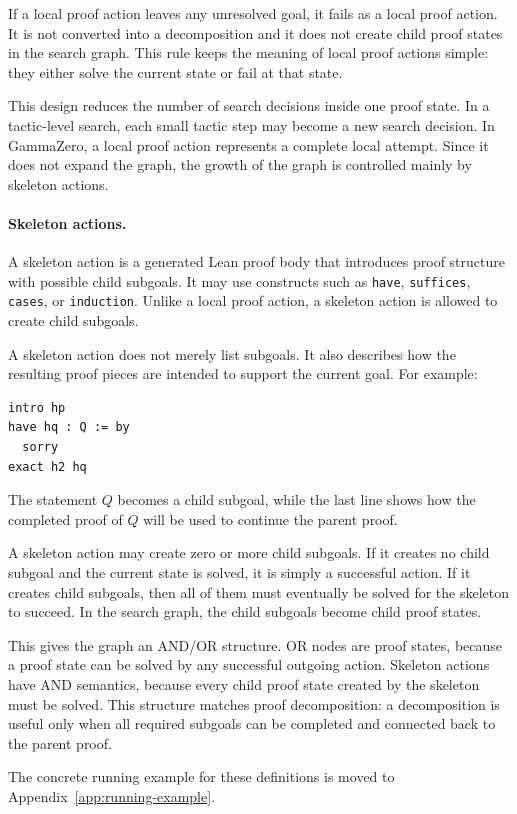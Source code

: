 \documentclass[en]{uet_awesome_thesis/uet-awesome-thesis}
\begin{document}
If a local proof action leaves any unresolved goal, it fails as a local proof action. It is not converted into a decomposition and it does not create child proof states in the search graph. This rule keeps the meaning of local proof actions simple: they either solve the current state or fail at that state.

This design reduces the number of search decisions inside one proof state. In a tactic-level search, each small tactic step may become a new search decision. In GammaZero, a local proof action represents a complete local attempt. Since it does not expand the graph, the growth of the graph is controlled mainly by skeleton actions.

\paragraph{Skeleton actions.}
A skeleton action is a generated Lean proof body that introduces proof structure with possible child subgoals. It may use constructs such as \texttt{have}, \texttt{suffices}, \texttt{cases}, or \texttt{induction}. Unlike a local proof action, a skeleton action is allowed to create child subgoals.

A skeleton action does not merely list subgoals. It also describes how the resulting proof pieces are intended to support the current goal. For example:
\begin{verbatim}
intro hp
have hq : Q := by
  sorry
exact h2 hq
\end{verbatim}
The statement \(Q\) becomes a child subgoal, while the last line shows how the completed proof of \(Q\) will be used to continue the parent proof.

A skeleton action may create zero or more child subgoals. If it creates no child subgoal and the current state is solved, it is simply a successful action. If it creates child subgoals, then all of them must eventually be solved for the skeleton to succeed. In the search graph, the child subgoals become child proof states.

This gives the graph an AND/OR structure. OR nodes are proof states, because a proof state can be solved by any successful outgoing action. Skeleton actions have AND semantics, because every child proof state created by the skeleton must be solved. This structure matches proof decomposition: a decomposition is useful only when all required subgoals can be completed and connected back to the parent proof.

The concrete running example for these definitions is moved to Appendix~\ref{app:running-example}.
\end{document}
